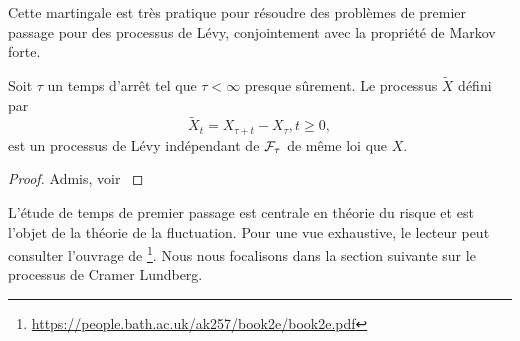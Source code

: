 Cette martingale est très pratique pour résoudre des problèmes de premier passage pour des processus de Lévy, conjointement avec la propriété de Markov forte.
\begin{theo}\label{theo:levy_strong_markov}
Soit $\tau$ un temps d'arrêt tel que $\tau<\infty$ presque sûrement. Le processus $\tilde{X}$ défini par 
$$
\tilde{X}_t = X_{\tau + t}-X_{\tau},t\geq 0,
$$
est un processus de Lévy indépendant de $\mathcal{F}_\tau$ de même loi que $X$.
\end{theo}
\begin{proof}
Admis, voir \citet[Chapitre 3]{Kyprianou2014}
\end{proof}

L'étude de temps de premier passage est centrale en théorie du risque et est l'objet de la théorie de la fluctuation. Pour une vue exhaustive, le lecteur peut consulter l'ouvrage de \citet{Kyprianou2014}\footnote{\url{https://people.bath.ac.uk/ak257/book2e/book2e.pdf}}. Nous nous focalisons dans la section suivante sur le processus de Cramer Lundberg.
